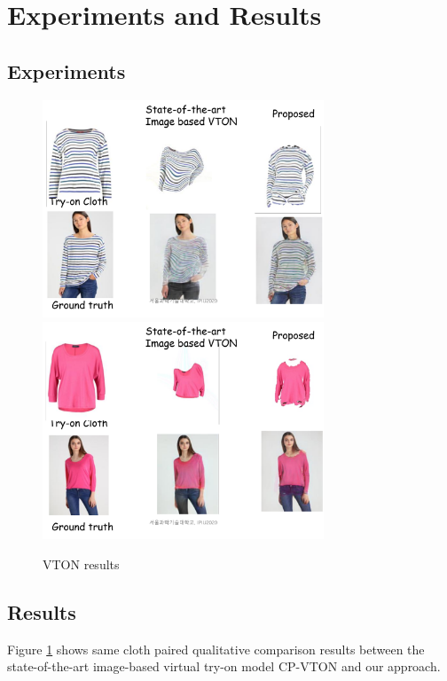 \section{Experiments and Results }  \label{section:experimentresults}


\subsection{Experiments}


\begin{figure}[t]
\centering
\includegraphics[height=6.5cm, scale=1]{figures/vton_result1.png} 
\includegraphics[height=6.5cm, scale=1]{figures/vton_result2.png} 
\caption{VTON results}
\label{fig:vtonresults}
\end{figure}


\subsection{Results}

Figure \ref{fig:vtonresults} shows same cloth paired qualitative comparison results between the state-of-the-art image-based virtual try-on model CP-VTON\cite{Wang2018TowardCI} and our approach.